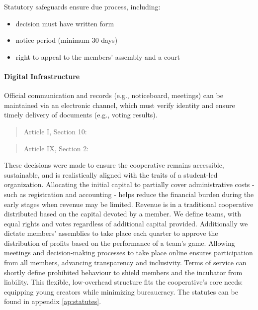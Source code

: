 Statutory safeguards ensure due process, including:
\begin{itemize}
    \item decision must have written form
    \item notice period (minimum 30 days)
    \item right to appeal to the members’ assembly and a court
\end{itemize}
\paragraph{Digital Infrastructure}
Official communication and records (e.g., noticeboard, meetings) can be maintained via an electronic channel, which must verify identity and ensure timely delivery of documents (e.g., voting results).
\begin{quote}
    Article I, Section 10: 
\end{quote}

\begin{quote}
    Article IX, Section 2: 
\end{quote}

These decisions were made to ensure the cooperative remains accessible, sustainable, and is realistically aligned with the traits of a student-led organization. Allocating the initial capital to partially cover administrative costs - such as registration and accounting - helps reduce the financial burden during the early stages when revenue may be limited. Revenue is in a traditional cooperative distributed based on the capital devoted by a member. We define teams, with equal rights and votes regardless of additional capital provided. Additionally we dictate members’ assemblies to take place each quarter to approve the distribution of profits  based on the performance of a team’s game. Allowing meetings and decision-making processes to take place online ensures participation from all members, advancing transparency and inclusivity. Terms of service can shortly define prohibited behaviour to shield members and the incubator from liability. This flexible, low-overhead structure fits the cooperative's core needs: equipping young creators while minimizing bureaucracy. The statutes can be found in appendix \ref{ap:statutes}.

